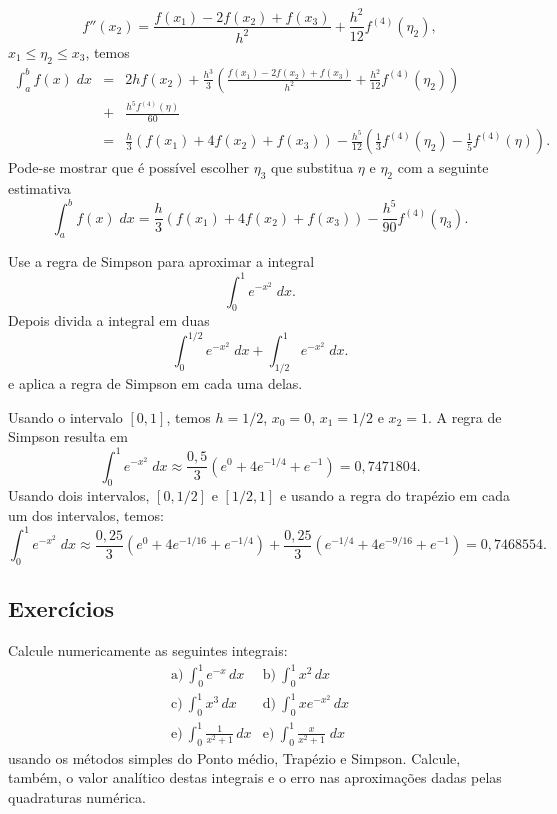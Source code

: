 $$
f''(x_2)=\frac{f(x_1)-2f(x_2)+f(x_3)}{h^2}+\frac{h^2}{12}f^{(4)}(\eta_2),
$$
$x_1\leq \eta_2\leq x_3$, temos
\begin{eqnarray*}
\int_a^bf(x)\;dx&=&2hf(x_2)+\frac{h^3}{3}\left(\frac{f(x_1)-2f(x_2)+f(x_3)}{h^2}+\frac{h^2}{12}f^{(4)}(\eta_2)\right)\\
&+&\frac{h^5f^{(4)}(\eta)}{60}\\
&=&\frac{h}{3}\left(f(x_1)+4f(x_2)+f(x_3)\right)-\frac{h^5}{12}\left(\frac{1}{3}f^{(4)}(\eta_2)-\frac{1}{5}f^{(4)}(\eta)\right).
\end{eqnarray*}
Pode-se mostrar que é possível escolher $\eta_3$ que substitua $\eta$ e $\eta_2$ com a seguinte estimativa
$$
\int_a^bf(x)\;dx=\frac{h}{3}\left(f(x_1)+4f(x_2)+f(x_3)\right)-\frac{h^5}{90}f^{(4)}(\eta_3).
$$

\begin{ex}
Use a regra de Simpson para aproximar a integral
$$
\int_0^1e^{-x^2}\;dx.
$$
Depois divida a integral em duas
$$
\int_0^{1/2}e^{-x^2}\;dx+\int_{1/2}^{1}e^{-x^2}\;dx.
$$
e aplica a regra de Simpson em cada uma delas.
\end{ex}
Usando o intervalo $[0,1]$, temos $h=1/2$, $x_0=0$, $x_1=1/2$ e $x_2=1$. A regra de Simpson resulta em
$$
\int_0^1e^{-x^2}\;dx\approx \frac{0,5}{3}(e^{0}+4e^{-1/4}+e^{-1})=0,7471804.
$$
Usando dois intervalos, $[0,1/2]$ e $[1/2,1]$ e usando a regra do trapézio em cada um dos intervalos, temos:
$$
\int_0^1e^{-x^2}\;dx\approx \frac{0,25}{3}(e^{0}+4e^{-1/16}+e^{-1/4})+\frac{0,25}{3}(e^{-1/4}+4e^{-9/16}+e^{-1})=0,7468554.
$$

\subsection*{Exercícios}

\begin{exer}Calcule numericamente as seguintes integrais:
  \begin{eqnarray*}
    \text{a)}~\int_0^1e^{-x}\,dx & \text{b)}~\int_0^1x^2\,dx\\
    \text{c)}~\int_0^1x^3\,dx & \text{d)}~\int_0^1xe^{-x^2}\,dx\\
    \text{e)}~\int_0^1\frac{1}{x^2+1}\,dx &\text{e)}~\int_0^1\frac{x}{x^2+1}\;dx
  \end{eqnarray*}
usando os métodos simples do Ponto médio, Trapézio e Simpson. Calcule, também, o valor analítico destas integrais e o erro nas aproximações dadas pelas quadraturas numérica.
\end{exer}
%

